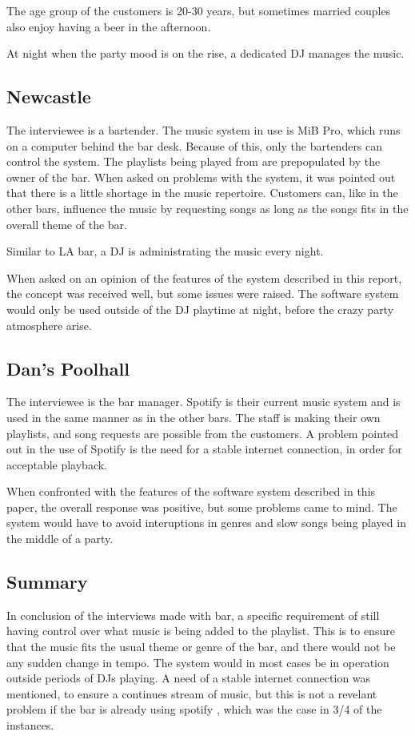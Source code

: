 The age group of the customers is 20-30 years, but sometimes married couples also enjoy having a beer in the afternoon.

At night when the party mood is on the rise, a dedicated DJ manages the music.

\subsection{Newcastle}
\label{sub:newcastle}

The interviewee is a bartender. The music system in use is MiB Pro, which runs on a computer behind the bar desk. Because of this, only the bartenders can control the system. The playlists being played from are prepopulated by the owner of the bar. When asked on problems with the system, it was pointed out that there is a little shortage in the music repertoire. Customers can, like in the other bars, influence the music by requesting songs as long as the songs fits in the overall theme of the bar.

Similar to LA bar, a DJ is administrating the music every night.

When asked on an opinion of the features of the system described in this report, the concept was received well, but some issues were raised. The software system would only be used outside of the DJ playtime at night, before the crazy party atmosphere arise.

\subsection{Dan's Poolhall}
\label{sub:dan_s_poolhall}

The interviewee is the bar manager. Spotify is their current music system and is used in the same manner as in the other bars. The staff is making their own playlists, and song requests are possible from the customers. A problem pointed out in the use of Spotify is the need for a stable internet connection, in order for acceptable playback. 

When confronted with the features of the software system described in this paper, the overall response was positive, but some problems came to mind. The system would have to avoid interuptions in genres and slow songs being played in the middle of a party.

\subsection{Summary}
\label{sub:summary}

In conclusion of the interviews made with bar, a specific requirement of still having control over what music is being added to the playlist. This is to ensure that the music fits the usual theme or genre of the bar, and there would not be any sudden change in tempo. The system would in most cases be in operation outside periods of DJs playing. A need of a stable internet connection was mentioned, to ensure a continues stream of music, but this is not a revelant problem if the bar is already using spotify \cite{A internet music streaming service}, which was the case in 3/4 of the instances.



